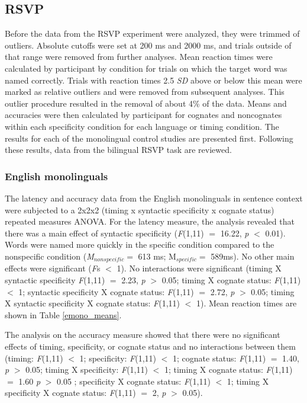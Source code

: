 \subsection{RSVP}
Before the data from the RSVP experiment were analyzed, they were trimmed of outliers. Absolute cutoffs were set at 200 ms and 2000 ms, and trials outside of that range were removed from further analyses. Mean reaction times were calculated by participant by condition for trials on which the target word was named correctly. Trials with reaction times 2.5 \textit{SD} above or below this mean were marked as relative outliers and were removed from subsequent analyses. This outlier procedure resulted in the removal of about 4\% of the data. Means and accuracies were then calculated by participant for cognates and noncognates within each specificity condition for each language or timing condition.  The results for each of the monolingual control studies are presented first. Following these results, data from the bilingual RSVP task are reviewed. 

\subsubsection{English monolinguals}
The latency and accuracy data from the English monolinguals in sentence context were subjected to a 2x2x2 (timing x syntactic specificity x cognate status) repeated measures ANOVA. For the latency measure, the analysis revealed that there was a main effect of syntactic specificity (\textit{F}(1,11) $=$ 16.22, \textit{p} $<$ 0.01). Words were named more quickly in the specific condition compared to the nonspecific condition (\textit{M}$_{nonspecific} =$ 613 ms; M$_{specific} =$ 589ms). No other main effects were significant (\textit{F}s $<$ 1). No interactions were significant (timing X syntactic specificity \textit{F}(1,11) $=$ 2.23, \textit{p} $>$ 0.05;  timing X cognate status: \textit{F}(1,11) $<$ 1; syntactic specificity X cognate status: \textit{F}(1,11) $=$ 2.72, \textit{p} $>$ 0.05; timing X syntactic specificity X cognate status: \textit{F}(1,11) $<$ 1). Mean reaction times are shown in Table \ref{emono_means}.




The analysis on the accuracy measure showed that there were no significant effects of timing, specificity, or cognate status and no interactions between them (timing: \textit{F}(1,11) $<$ 1; specificity:  \textit{F}(1,11) $<$ 1;  cognate status:  \textit{F}(1,11) $=$ 1.40, \textit{p} $>$ 0.05; timing X specificity:  \textit{F}(1,11) $<$ 1;  timing X cognate status:  \textit{F}(1,11) $=$ 1.60 \textit{p} $>$ 0.05 ; specificity X cognate status:  \textit{F}(1,11) $<$ 1; timing X specificity X cognate status:  \textit{F}(1,11) $=$ 2, \textit{p} $>$ 0.05).

